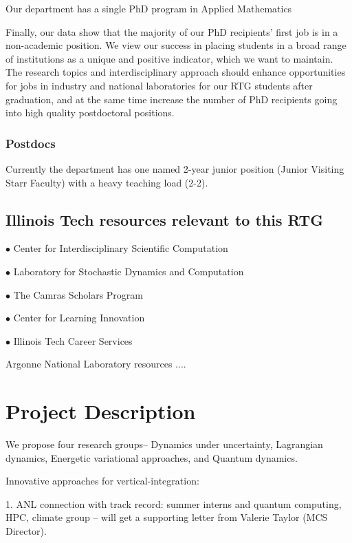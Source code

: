 \documentclass[11pt]{article}
\begin{document}
Our department has a single PhD program in Applied  Mathematics


Finally, our data show that the majority of our PhD recipients’ first job is in a non-academic position.
We view our success in placing students in a broad range of institutions as a unique and positive indicator,
which we want to maintain. The research topics and interdisciplinary approach should enhance opportunities
for jobs in industry and national laboratories for our RTG students after graduation, and at the same time
increase the number of PhD recipients going into high quality postdoctoral positions.


\subsubsection{Postdocs}

Currently the department has one named 2-year junior position (Junior Visiting Starr Faculty) with a heavy teaching load (2-2).


\subsection{Illinois Tech resources relevant to this RTG}

 $\bullet$ Center for Interdisciplinary Scientific Computation
 
 $\bullet$ Laboratory for Stochastic Dynamics and Computation
 
 
  $\bullet$  The Camras Scholars Program
  
  $\bullet$  Center for Learning Innovation 
 
 
 $\bullet$  Illinois Tech Career Services
 
 
 Argonne National Laboratory resources ....
 
 




\section{Project Description  }

We propose four research groups-- Dynamics  under uncertainty, 
Lagrangian  dynamics, Energetic variational approaches,  and 
Quantum dynamics.



Innovative approaches for vertical-integration:

1. ANL connection with track record: summer interns and quantum computing, HPC, climate group  -- will get a supporting letter from Valerie Taylor (MCS Director).
\end{document}
